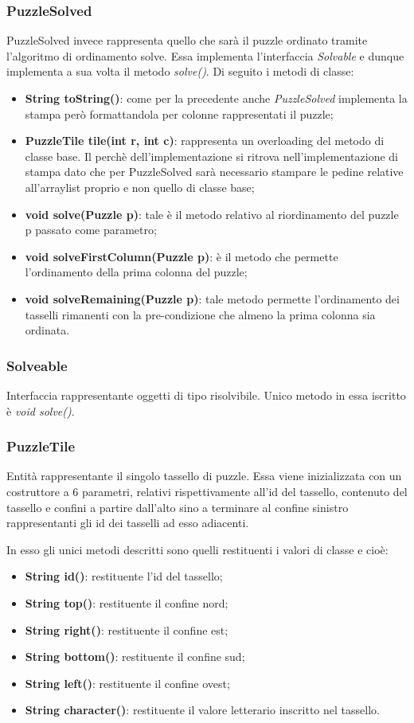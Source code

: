 \documentclass[11pt]{article}
\begin{document}
\subsubsection{PuzzleSolved}
PuzzleSolved invece rappresenta quello che sarà il puzzle ordinato tramite l'algoritmo di ordinamento solve. Essa implementa l'interfaccia \textit{Solvable} e dunque implementa a sua volta il metodo \textit{solve()}.
Di seguito i metodi di classe:
\begin{itemize}
    \item \textbf{String toString()}: come per la precedente anche \textit{PuzzleSolved} implementa la stampa però formattandola per colonne rappresentati il puzzle;
    \item \textbf{PuzzleTile tile(int r, int c)}: rappresenta un overloading del metodo di classe base. Il perchè dell'implementazione si ritrova nell'implementazione di stampa dato che per PuzzleSolved sarà necessario stampare le pedine relative all'arraylist proprio e non quello di classe base;
    \item \textbf{void solve(Puzzle p)}: tale è il metodo relativo al riordinamento del puzzle p passato come parametro;
    \item \textbf{void solveFirstColumn(Puzzle p)}: è il metodo che permette l'ordinamento della prima colonna del puzzle;
    \item \textbf{void solveRemaining(Puzzle p)}: tale metodo permette l'ordinamento dei tasselli rimanenti con la pre-condizione che almeno la prima colonna sia ordinata.
\end{itemize}
\subsubsection{Solveable}
Interfaccia rappresentante oggetti di tipo risolvibile. Unico metodo in essa iscritto è \textit{void solve()}.
\subsubsection{PuzzleTile}
Entità rappresentante il singolo tassello di puzzle. Essa viene inizializzata con un costruttore a 6 parametri, relativi rispettivamente all'id del tassello, contenuto del tassello e confini a partire dall'alto sino a terminare al confine sinistro rappresentanti gli id dei tasselli ad esso adiacenti.

In esso gli unici metodi descritti sono quelli restituenti i valori di classe e cioè:
\begin{itemize}
    \item \textbf{String id()}: restituente l'id del tassello;
    \item \textbf{String top()}: restituente il confine nord;
    \item \textbf{String right()}: restituente il confine est;
    \item \textbf{String bottom()}: restituente il confine sud;
    \item \textbf{String left()}: restituente il confine ovest;
    \item \textbf{String character()}: restituente il valore letterario inscritto nel tassello.
\end{itemize}
\end{document}
